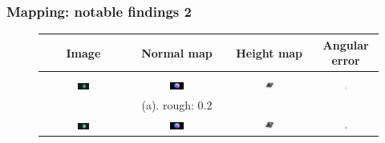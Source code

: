 \documentclass{beamer}
\begin{document}
\begin{frame}
\frametitle{Mapping: notable findings 2}

\begin{figure}[!htbp]
\centering
\begin{tabular}{c|ccc}
  Image & Normal map & Height map & Angular error\\
  \hline\\
  \includegraphics[width=0.15\textwidth]{mapping/ps_spec_rough/0802_0001}&
  \includegraphics[width=0.15\textwidth]{mapping/ps_spec_rough/0802_normal}&
  \includegraphics[width=0.15\textwidth]{images/0802_dmap}&
  \includegraphics[width=0.03\textwidth]{mapping/ps_spec_rough/0802_ang_error}\\
  & (a). rough: 0.2\\
  \includegraphics[width=0.15\textwidth]{mapping/ps_spec_rough/0805_0001}&
  \includegraphics[width=0.15\textwidth]{mapping/ps_spec_rough/0805_normal}&
  \includegraphics[width=0.15\textwidth]{images/0805_dmap}&
  \includegraphics[width=0.03\textwidth]{mapping/ps_spec_rough/0805_ang_error}\\

\end{tabular}
\end{figure}
\end{frame}
\end{document}
